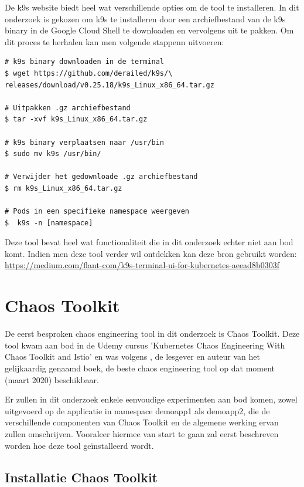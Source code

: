De k9s website biedt heel wat verschillende opties om de tool te installeren. \autocite{K9s2022}
\newline In dit onderzoek is gekozen om k9s te installeren door een archiefbestand van de k9s binary in de Google Cloud Shell te downloaden en vervolgens uit te pakken. Om dit proces te herhalen kan men volgende stappenn uitvoeren: 
\begin{lstlisting}
# k9s binary downloaden in de terminal
$ wget https://github.com/derailed/k9s/\
releases/download/v0.25.18/k9s_Linux_x86_64.tar.gz

# Uitpakken .gz archiefbestand
$ tar -xvf k9s_Linux_x86_64.tar.gz

# k9s binary verplaatsen naar /usr/bin
$ sudo mv k9s /usr/bin/

# Verwijder het gedownloade .gz archiefbestand
$ rm k9s_Linux_x86_64.tar.gz

# Pods in een specifieke namespace weergeven
$  k9s -n [namespace]
\end{lstlisting} 

Deze tool bevat heel wat functionaliteit die in dit onderzoek echter niet aan bod komt. Indien men deze tool verder wil ontdekken kan deze bron gebruikt worden: \url{https://medium.com/flant-com/k9s-terminal-ui-for-kubernetes-aeead8b0303f}

\section{Chaos Toolkit}

De eerst besproken chaos engineering tool in dit onderzoek is Chaos Toolkit. Deze tool kwam aan bod in de Udemy cursus 'Kubernetes Chaos Engineering With Chaos Toolkit and Istio' en was volgens \textcite{Viktor Farcic}, de lesgever en auteur van het gelijkaardig genaamd boek, de beste chaos engineering tool op dat moment (maart 2020) beschikbaar. 

Er zullen in dit onderzoek enkele eenvoudige experimenten aan bod komen, zowel uitgevoerd op de applicatie in namespace demoapp1 als demoapp2, die de verschillende componenten van Chaos Toolkit en de algemene werking ervan zullen omschrijven. Vooraleer hiermee van start te gaan zal eerst beschreven worden hoe deze tool geïnstalleerd wordt.    

\subsection{Installatie Chaos Toolkit}

